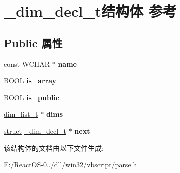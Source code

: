 \hypertarget{struct__dim__decl__t}{}\section{\+\_\+dim\+\_\+decl\+\_\+t结构体 参考}
\label{struct__dim__decl__t}
\subsection*{Public 属性}
\begin{DoxyCompactItemize}
\item 
\mbox{\label{struct__dim__decl__t_a1671793e02f97e64628068cd0b7b1e6b}} 
const W\+C\+H\+AR $\ast$ {\bfseries name}
\item 
\mbox{\label{struct__dim__decl__t_aa082e6f6564f1ab07744ce56e031fb61}} 
B\+O\+OL {\bfseries is\+\_\+array}
\item 
\mbox{\label{struct__dim__decl__t_a24a36c68faff9a442d64efd70c0ef0cf}} 
B\+O\+OL {\bfseries is\+\_\+public}
\item 
\mbox{\label{struct__dim__decl__t_a23fd46c0e6fb390fd12d9dce6ce94944}} 
\hyperlink{struct__dim__list__t}{dim\+\_\+list\+\_\+t} $\ast$ {\bfseries dims}
\item 
\mbox{\label{struct__dim__decl__t_a0e5dd369c54514807a8d0ecc58b2daaa}} 
\hyperlink{interfacestruct}{struct} \hyperlink{struct__dim__decl__t}{\+\_\+dim\+\_\+decl\+\_\+t} $\ast$ {\bfseries next}
\end{DoxyCompactItemize}


该结构体的文档由以下文件生成\+:\begin{DoxyCompactItemize}
\item 
E\+:/\+React\+O\+S-\/0../dll/win32/vbscript/parse.\+h\end{DoxyCompactItemize}
